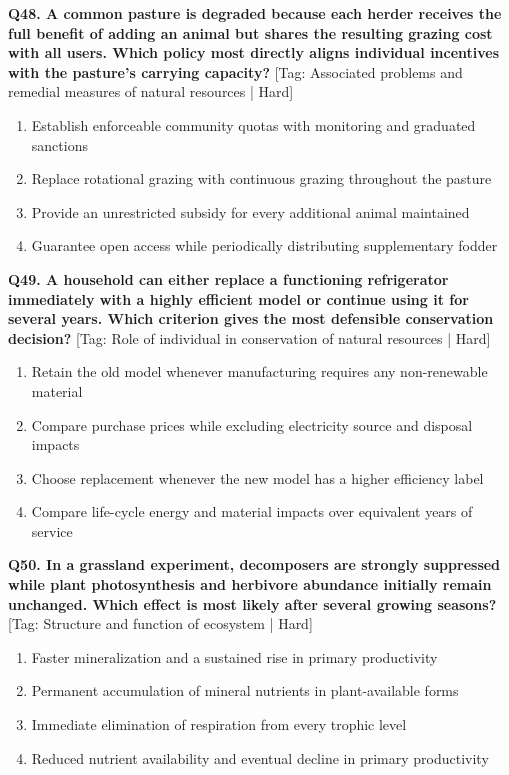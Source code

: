 \noindent\textbf{Q48. A common pasture is degraded because each herder receives the full benefit of adding an animal but shares the resulting grazing cost with all users. Which policy most directly aligns individual incentives with the pasture's carrying capacity?} \hfill [Tag: Associated problems and remedial measures of natural resources | Hard]
\begin{enumerate}[label=(\alph*),topsep=2pt,itemsep=1pt,partopsep=0pt,parsep=0pt]
    \item {Establish enforceable community quotas with monitoring and graduated sanctions}
    \item {Replace rotational grazing with continuous grazing throughout the pasture}
    \item {Provide an unrestricted subsidy for every additional animal maintained}
    \item {Guarantee open access while periodically distributing supplementary fodder}
\end{enumerate}
\vspace{2mm}

\noindent\textbf{Q49. A household can either replace a functioning refrigerator immediately with a highly efficient model or continue using it for several years. Which criterion gives the most defensible conservation decision?} \hfill [Tag: Role of individual in conservation of natural resources | Hard]
\begin{enumerate}[label=(\alph*),topsep=2pt,itemsep=1pt,partopsep=0pt,parsep=0pt]
    \item {Retain the old model whenever manufacturing requires any non-renewable material}
    \item {Compare purchase prices while excluding electricity source and disposal impacts}
    \item {Choose replacement whenever the new model has a higher efficiency label}
    \item {Compare life-cycle energy and material impacts over equivalent years of service}
\end{enumerate}
\vspace{2mm}

\noindent\textbf{Q50. In a grassland experiment, decomposers are strongly suppressed while plant photosynthesis and herbivore abundance initially remain unchanged. Which effect is most likely after several growing seasons?} \hfill [Tag: Structure and function of ecosystem | Hard]
\begin{enumerate}[label=(\alph*),topsep=2pt,itemsep=1pt,partopsep=0pt,parsep=0pt]
    \item {Faster mineralization and a sustained rise in primary productivity}
    \item {Permanent accumulation of mineral nutrients in plant-available forms}
    \item {Immediate elimination of respiration from every trophic level}
    \item {Reduced nutrient availability and eventual decline in primary productivity}
\end{enumerate}
\vspace{2mm}

